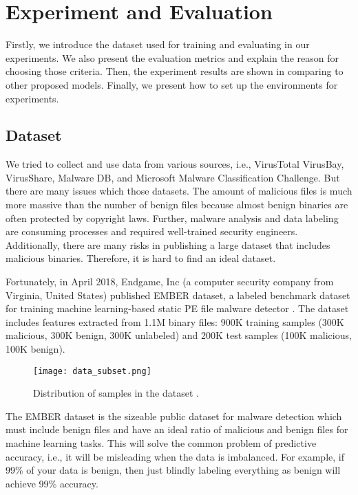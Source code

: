\chapter{Experiment and Evaluation}
\graphicspath{{Chapter5/Figs/}}

\begin{chapabstract}
Firstly, we introduce the dataset used for training and evaluating in our experiments. We also present the evaluation metrics and explain the reason for choosing those criteria. Then, the experiment results are shown in comparing to other proposed models. Finally, we present how to set up the environments for experiments.
\end{chapabstract}

\section{Dataset}
\label{sec:dataset}

We tried to collect and use data from various sources, i.e., VirusTotal VirusBay, VirusShare, Malware DB, and Microsoft Malware Classification Challenge. But there are many issues which those datasets. The amount of malicious files is much more massive than the number of benign files because almost benign binaries are often protected by copyright laws. Further, malware analysis and data labeling are consuming processes and required well-trained security engineers. Additionally, there are many risks in publishing a large dataset that includes malicious binaries. Therefore, it is hard to find an ideal dataset.

Fortunately, in April 2018, Endgame, Inc (a computer security company from Virginia, United States) published EMBER dataset, a labeled benchmark dataset for training machine learning-based static PE file malware detector \cite{anderson2018ember}. The dataset includes features extracted from 1.1M binary files: 900K training samples (300K malicious, 300K benign, 300K unlabeled) and 200K test samples (100K malicious, 100K benign).

\begin{figure}[H] 
\centering
\texttt{[image: data\_subset.png]}
\caption{Distribution of samples in the dataset \cite{anderson2018ember}.}
\label{fig:ember}
\end{figure}
 
The EMBER dataset is the sizeable public dataset for malware detection which must include benign files and have an ideal ratio of malicious and benign files for machine learning tasks. This will solve the common problem of predictive accuracy, i.e., it will be misleading when the data is imbalanced. For example, if 99\% of your data is benign, then just blindly labeling everything as benign will achieve 99\% accuracy.

